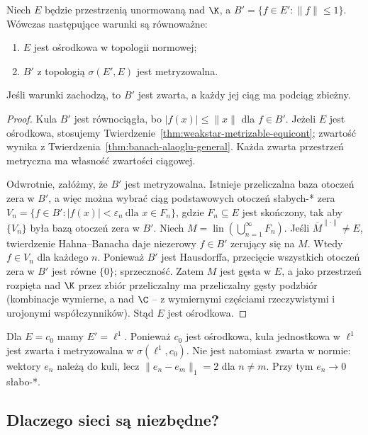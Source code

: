 \begin{twierdzenie}
\label{thm:banach-ball-metrizable-iff-separable}
Niech $E$ będzie przestrzenią unormowaną nad $\K$,
a $B'=\{f\in E':\|f\|\le1\}$. Wówczas następujące
warunki są równoważne:
\begin{enumerate}
\item $E$ jest ośrodkowa w topologii normowej;
\item $B'$ z topologią $\sigma(E',E)$ jest metryzowalna.
\end{enumerate}
Jeśli warunki zachodzą, to $B'$ jest zwarta, a każdy jej ciąg ma podciąg zbieżny.
\end{twierdzenie}
\begin{proof}
Kula $B'$ jest równociągła, bo $|f(x)|\le\|x\|$ dla $f\in B'$.
Jeżeli $E$ jest ośrodkowa, stosujemy
Twierdzenie~\ref{thm:weakstar-metrizable-equicont};
zwartość wynika z Twierdzenia~\ref{thm:banach-alaoglu-general}.
Każda zwarta przestrzeń metryczna ma własność zwartości ciągowej.

Odwrotnie, załóżmy, że $B'$ jest metryzowalna. Istnieje
przeliczalna baza otoczeń zera w $B'$, a więc można wybrać
ciąg podstawowych otoczeń słabych-* zera
$V_n=\{f\in B':|f(x)|<\varepsilon_n\ \text{dla }x\in F_n\}$,
gdzie $F_n\subseteq E$ jest skończony, tak aby $\{V_n\}$
była bazą otoczeń zera w $B'$. Niech
$M=\operatorname{lin}(\bigcup_{n=1}^\infty F_n)$.
Jeśli $\overline M^{\|\cdot\|}\ne E$, twierdzenie Hahna--Banacha
daje niezerowy $f\in B'$ zerujący się na $M$.
Wtedy $f\in V_n$ dla każdego $n$. Ponieważ $B'$ jest Hausdorffa,
przecięcie wszystkich otoczeń zera w $B'$ jest równe $\{0\}$;
sprzeczność. Zatem $M$ jest gęsta w $E$, a jako przestrzeń
rozpięta nad $\K$ przez zbiór przeliczalny ma przeliczalny
gęsty podzbiór (kombinacje wymierne, a nad $\C$ -- z
wymiernymi częściami rzeczywistymi i urojonymi współczynników).
Stąd $E$ jest ośrodkowa.
\end{proof}

\begin{przyklad}
Dla $E=c_0$ mamy $E'=\ell^1$. Ponieważ $c_0$ jest ośrodkowa,
kula jednostkowa w $\ell^1$ jest zwarta i metryzowalna
w $\sigma(\ell^1,c_0)$. Nie jest natomiast zwarta w normie:
wektory $e_n$ należą do kuli, lecz $\|e_n-e_m\|_1=2$
dla $n\ne m$. Przy tym $e_n\to0$ słabo-*.
\end{przyklad}

\subsection{Dlaczego sieci są niezbędne?}

